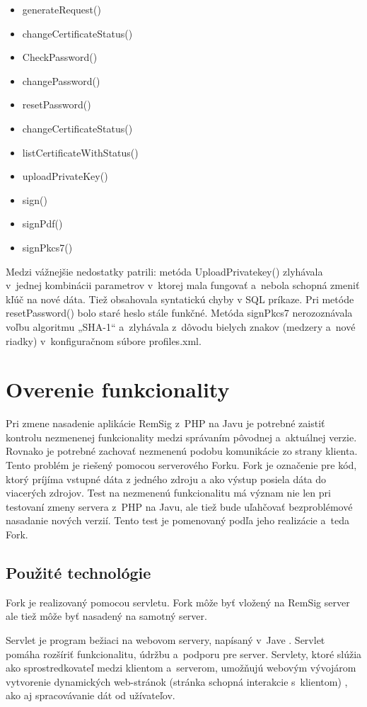 \documentclass[
  digital, %
  table,   %
oneside,
  nolof,     %
  nolot,     %
]{fithesis3}
\begin{document}
\begin{itemize}

\item generateRequest()
\item changeCertificateStatus()
\item CheckPassword()
\item changePassword()
\item resetPassword()
\item changeCertificateStatus()
\item listCertificateWithStatus()
\item uploadPrivateKey()
\item sign()
\item signPdf()
\item signPkcs7()
 \end{itemize}


Medzi vážnejšie nedostatky patrili: metóda UploadPrivatekey() zlyhávala v~jednej kombinácii parametrov v~ktorej mala fungovať a~nebola schopná zmeniť kľúč na nové dáta. Tiež obsahovala syntatickú chyby v SQL príkaze. Pri metóde resetPassword() bolo staré heslo stále funkčné. Metóda signPkcs7 nerozoznávala voľbu algoritmu „SHA-1“ a~zlyhávala z~dôvodu bielych znakov (medzery a~nové riadky) v~konfiguračnom súbore profiles.xml. 



\section{Overenie funkcionality}
Pri zmene nasadenie aplikácie RemSig z~PHP na Javu je potrebné zaistiť kontrolu nezmenenej funkcionality medzi správaním pôvodnej a~aktuálnej verzie. Rovnako je potrebné zachovať nezmenenú podobu komunikácie zo strany klienta. Tento problém je riešený pomocou serverového Forku. Fork je označenie pre kód, ktorý príjíma vstupné dáta z jedného zdroju a ako výstup posiela dáta do viacerých zdrojov. Test na nezmenenú funkcionalitu má význam nie len pri testovaní zmeny servera z~PHP na Javu, ale tiež bude uľahčovať bezproblémové nasadanie nových verzií. Tento test je pomenovaný podľa jeho realizácie a~teda Fork. 
\subsection{Použité technológie}
Fork je realizovaný pomocou servletu. Fork môže byť vložený na RemSig server ale tiež môže byť nasadený na samotný server.

Servlet je program bežiaci na webovom servery, napísaný v~Jave \cite{servlet}. Servlet pomáha rozšíriť  funkcionalitu, údržbu a~podporu pre server. Servlety, ktoré slúžia ako sprostredkovateľ medzi klientom a~serverom,  umožňujú webovým vývojárom vytvorenie dynamických web-stránok (stránka schopná interakcie s~klientom) \cite{staticVsDynamic}, ako aj spracovávanie dát od užívateľov. 
\end{document}

